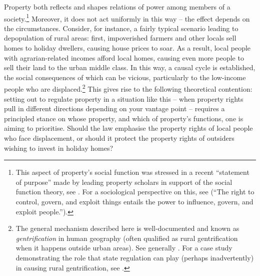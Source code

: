 Property both reflects and shapes relations of power among members of a society.\footnote{This aspect of property's social function was stressed in a recent ``statement of purpose'' made by leading property scholars in support of the social function theory, see \cite{alexander09a}. For a sociological perspective on this, see \cite[23]{carruthers04} (``The right to control, govern, and exploit things entails the power to influence, govern, and exploit people.'').} Moreover, it does not act uniformly in this way -- the effect depends on the circumstances.  Consider, for instance, a fairly typical scenario leading to depopulation of rural areas: first, impoverished farmers and other locals sell homes to holiday dwellers, causing house prices to soar. As a result, local people with agrarian-related incomes  afford local homes, causing even more people to sell their land to the urban middle class. In this way, a causal cycle is established, the social consequences of which can be vicious, particularly to the low-income people who are displaced.\footnote{The general mechanism described here is well-documented and known as {\it gentrification} in human geography (often qualified as rural gentrification when it happens outside urban areas). See generally \cite{weesep94,phillips93,slater06}. For a case study demonstrating the role that state regulation can play (perhaps inadvertently) in causing rural gentrification, see \cite[1027-1030]{darling05}.} This gives rise to the following  theoretical contention: setting out to regulate property in a situation like this -- when property rights pull in different directions depending on your vantage point -- requires a principled stance on whose property, and which of property's functions, one is aiming to prioritise. Should the law emphasise the property rights of local people who face displacement, or should it protect the property rights of outsiders wishing to invest in holiday homes?

